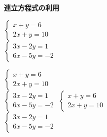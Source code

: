 \documentclass[17pt,b4paper, landscape]{ltjsarticle}%
\begin{document}
{\textbf{\Large{連立方程式の利用}}}\hspace{\fill}{\scalebox{1.5}{（　）組（　　　　　　　　）}}\\
\begin{multicols*}{3}
$\begin{cases}
	x + y = 6\\ 2x + y = 10
\end{cases}$ 	\\[70mm]
$\begin{cases}
	3x - 2y = 1\\ 6x -5y = -2
\end{cases}$\vfill\null\columnbreak

$\begin{cases}
	x + y = 6\\ 2x + y = 10
\end{cases}$ 	\\[70mm]
$\begin{cases}
	3x - 2y = 1\\ 6x -5y = -2
\end{cases}$
 \vfill\null\columnbreak
$\begin{cases}
	x + y = 6\\ 2x + y = 10
\end{cases}$ 	\\[70mm]
$\begin{cases}
	3x - 2y = 1\\ 6x -5y = -2
\end{cases}$



\end{multicols*}
\end{document}
